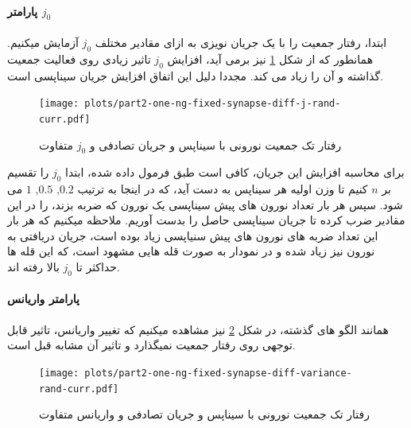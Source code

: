             \paragraph*{پارامتر $j_0$}
                ابتدا، رفتار جمعیت را با یک جریان نویزی به ازای مقادیر مختلف 
                $j_0$ 
                آزمایش میکنیم. همانطور که از شکل 
                \ref{fig:part2-one-ng-fixed-synapse-diff-j-rand-curr}
                نیز برمی آید، افزایش 
                $j_0$ 
                تاثیر زیادی روی فعالیت جمعیت گذاشته و آن را زیاد می کند. مجددا دلیل این اتفاق افزایش جریان سیناپسی است. 
                \begin{figure}[!ht]
                    \centering
                    \texttt{[image: plots/part2-one-ng-fixed-synapse-diff-j-rand-curr.pdf]} 
                    \caption{رفتار تک جمعیت نورونی با سیناپس و جریان تصادفی و $j_0$ متفاوت}
                    \label{fig:part2-one-ng-fixed-synapse-diff-j-rand-curr}
                \end{figure}

                برای محاسبه افزایش این جریان، کافی است طبق فرمول داده شده، ابتدا 
                $j_0$ 
                را تقسیم بر 
                $n$ 
                کنیم تا وزن اولیه هر سیناپس به دست آید، که در اینجا به ترتیب 
                $0.2$, $0.5$, $1$ 
                می شود. سپس هر بار تعداد نورون های پیش سیناپسی یک نورون که ضربه بزند، را در این مقادیر ضرب کرده تا جریان سیناپسی حاصل را بدست آوریم. ملاحظه میکنیم که هر بار این تعداد ضربه های نورون های پیش سنیاپسی زیاد بوده است، جریان دریافتی به نورون نیز زیاد شده و در نمودار به صورت قله هایی مشهود است، که این قله ها حداکثر تا 
                $j_0$ 
                بالا رفته اند.

            \paragraph*{پارامتر واریانس}
                همانند الگو های گذشته، در شکل
                \ref{fig:part2-one-ng-fixed-synapse-diff-variance-rand-curr}
                نیز مشاهده میکنیم که تغییر واریانس، تاثیر قابل توجهی روی رفتار جمعیت نمیگذارد و تاثیر آن مشابه قبل است.
                \begin{figure}[!ht]
                    \centering
                    \texttt{[image: plots/part2-one-ng-fixed-synapse-diff-variance-rand-curr.pdf]} 
                    \caption{رفتار تک جمعیت نورونی با سیناپس و جریان تصادفی و واریانس متفاوت}
                    \label{fig:part2-one-ng-fixed-synapse-diff-variance-rand-curr}
                \end{figure}
            
